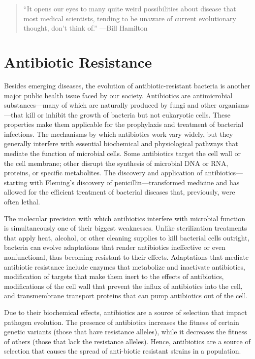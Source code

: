 \documentclass[
]{book}
\begin{document}
\begin{quote}
``It opens our eyes to many quite weird possibilities about disease that most medical scientists, tending to be unaware of current evolutionary thought, don't think of.'' ---Bill Hamilton
\end{quote}

\hypertarget{antibiotic-resistance}{%
\section{Antibiotic Resistance}\label{antibiotic-resistance}}

Besides emerging diseases, the evolution of antibiotic-resistant bacteria is another major public health issue faced by our society. Antibiotics are antimicrobial substances---many of which are naturally produced by fungi and other organisms---that kill or inhibit the growth of bacteria but not eukaryotic cells. These properties make them applicable for the prophylaxis and treatment of bacterial infections. The mechanisms by which antibiotics work vary widely, but they generally interfere with essential biochemical and physiological pathways that mediate the function of microbial cells. Some antibiotics target the cell wall or the cell membrane; other disrupt the synthesis of microbial DNA or RNA, proteins, or specific metabolites. The discovery and application of antibiotics---starting with Fleming's discovery of penicillin---transformed medicine and has allowed for the efficient treatment of bacterial diseases that, previously, were often lethal.

The molecular precision with which antibiotics interfere with microbial function is simultaneously one of their biggest weaknesses. Unlike sterilization treatments that apply heat, alcohol, or other cleaning supplies to kill bacterial cells outright, bacteria can evolve adaptations that render antibiotics ineffective or even nonfunctional, thus becoming resistant to their effects. Adaptations that mediate antibiotic resistance include enzymes that metabolize and inactivate antibiotics, modification of targets that make them inert to the effects of antibiotics, modifications of the cell wall that prevent the influx of antibiotics into the cell, and transmembrane transport proteins that can pump antibiotics out of the cell.

Due to their biochemical effects, antibiotics are a source of selection that impact pathogen evolution. The presence of antibiotics increases the fitness of certain genetic variants (those that have resistance alleles), while it decreases the fitness of others (those that lack the resistance alleles). Hence, antibiotics are a source of selection that causes the spread of anti-biotic resistant strains in a population.
\end{document}
